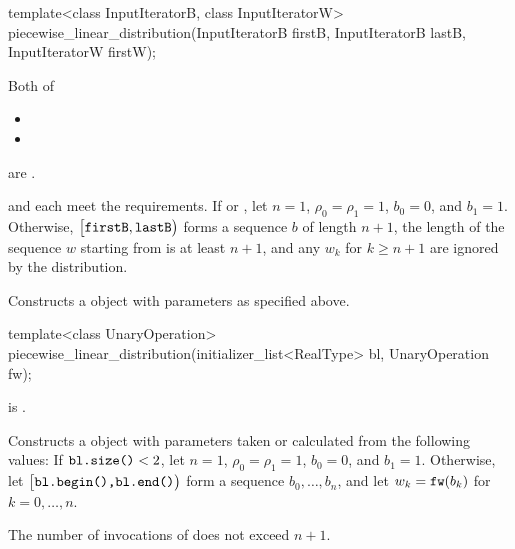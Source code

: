 \begin{itemdecl}
template<class InputIteratorB, class InputIteratorW>
  piecewise_linear_distribution(InputIteratorB firstB, InputIteratorB lastB,
                                InputIteratorW firstW);
\end{itemdecl}

\begin{itemdescr}
\pnum
\mandates
Both of
\begin{itemize}
\item{}
\item{}
\end{itemize}
are .

\pnum
\expects
   and 
   each meet the
   requirements.
 If 
 or ,
 let $n = 1$,
     $\rho_0 = \rho_1 = 1$,
     $b_0 = 0$,
 and $b_1 = 1$.
 Otherwise,
 $\bigl[\texttt{\protect firstB}, \texttt{\protect lastB}\bigr)$
 forms a sequence $b$ of length $n+1$,
 the length of the sequence $w$ starting from 
 is at least $n+1$,
 and any $w_k$ for $k \geq n + 1$ are ignored by the distribution.

\pnum
\effects
Constructs a  object
 with parameters as specified above.
\end{itemdescr}


%
\begin{itemdecl}
template<class UnaryOperation>
  piecewise_linear_distribution(initializer_list<RealType> bl, UnaryOperation fw);
\end{itemdecl}

\begin{itemdescr}
\pnum
\mandates
{} is .

\pnum
\effects
Constructs a  object
 with parameters taken or calculated
 from the following values:
 If $\texttt{\protect bl.size()} < 2$,
 let $n = 1$,
     $\rho_0 = \rho_1 = 1$,
     $b_0 = 0$,
 and $b_1 = 1$.
 Otherwise,
 let $\bigl[\texttt{\protect bl.begin(),} \texttt{\protect bl.end()}\bigr)$
 form a sequence $b_0, \dotsc, b_n$,
 and
 let $w_k = \texttt{\protect fw}(b_k)$
 for $k = 0, \dotsc, n$.

\pnum
\complexity
The number of invocations of  does not exceed $n+1$.
\end{itemdescr}



